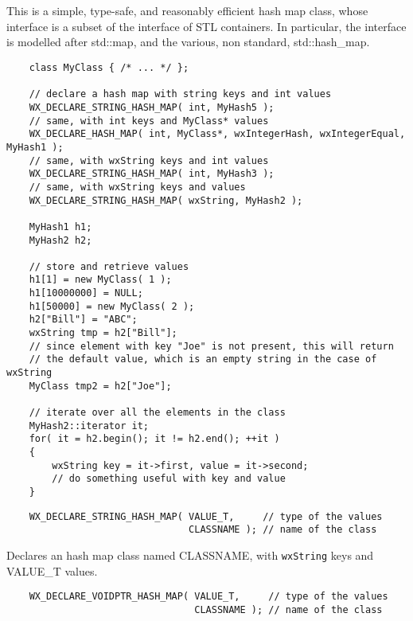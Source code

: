 \section{}\label{wxhashmap}

This is a simple, type-safe, and reasonably efficient hash map class,
whose interface is a subset of the interface of STL containers. In
particular, the interface is modelled after std::map, and the various,
non standard, std::hash\_map.


\begin{verbatim}
    class MyClass { /* ... */ };

    // declare a hash map with string keys and int values
    WX_DECLARE_STRING_HASH_MAP( int, MyHash5 );
    // same, with int keys and MyClass* values
    WX_DECLARE_HASH_MAP( int, MyClass*, wxIntegerHash, wxIntegerEqual, MyHash1 );
    // same, with wxString keys and int values
    WX_DECLARE_STRING_HASH_MAP( int, MyHash3 );
    // same, with wxString keys and values
    WX_DECLARE_STRING_HASH_MAP( wxString, MyHash2 );

    MyHash1 h1;
    MyHash2 h2;

    // store and retrieve values
    h1[1] = new MyClass( 1 );
    h1[10000000] = NULL;
    h1[50000] = new MyClass( 2 );
    h2["Bill"] = "ABC";
    wxString tmp = h2["Bill"];
    // since element with key "Joe" is not present, this will return
    // the default value, which is an empty string in the case of wxString
    MyClass tmp2 = h2["Joe"];

    // iterate over all the elements in the class
    MyHash2::iterator it;
    for( it = h2.begin(); it != h2.end(); ++it )
    {
        wxString key = it->first, value = it->second;
        // do something useful with key and value
    }
\end{verbatim}


\begin{verbatim}
    WX_DECLARE_STRING_HASH_MAP( VALUE_T,     // type of the values
                                CLASSNAME ); // name of the class
\end{verbatim}

Declares an hash map class named CLASSNAME, with {\tt wxString} keys
and VALUE\_T values.

\begin{verbatim}
    WX_DECLARE_VOIDPTR_HASH_MAP( VALUE_T,     // type of the values
                                 CLASSNAME ); // name of the class
\end{verbatim}

